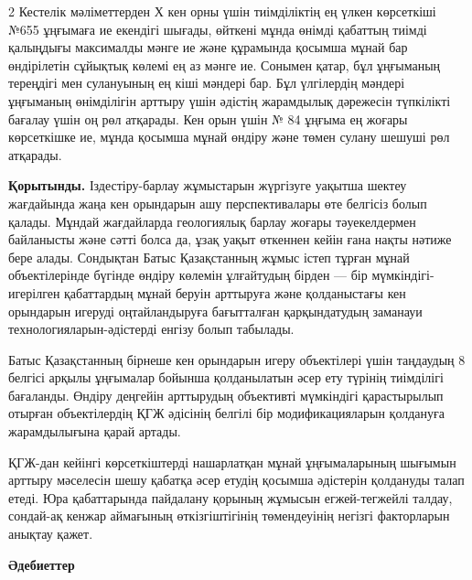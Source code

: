 \begin{multicols}{2}
Кестелік мәліметтерден Х кен орны үшін тиімділіктің ең үлкен көрсеткіші
№655 ұңғымаға ие екендігі шығады, өйткені мұнда өнімді қабаттың тиімді
қалыңдығы максималды мәнге ие және құрамында қосымша мұнай бар
өндірілетін сұйықтық көлемі ең аз мәнге ие. Сонымен қатар, бұл ұңғыманың
тереңдігі мен сулануының ең кіші мәндері бар. Бұл үлгілердің мәндері
ұңғыманың өнімділігін арттыру үшін әдістің жарамдылық дәрежесін
түпкілікті бағалау үшін оң рөл атқарады. Кен орын үшін № 84 ұңғыма ең
жоғары көрсеткішке ие, мұнда қосымша мұнай өндіру және төмен сулану
шешуші рөл атқарады.

{\bfseries Қорытынды.} Іздестіру-барлау жұмыстарын жүргізуге уақытша шектеу
жағдайында жаңа кен орындарын ашу перспективалары өте белгісіз болып
қалады. Мұндай жағдайларда геологиялық барлау жоғары тәуекелдермен
байланысты және сәтті болса да, ұзақ уақыт өткеннен кейін ғана нақты
нәтиже бере алады. Сондықтан Батыс Қазақстанның жұмыс істеп тұрған мұнай
объектілерінде бүгінде өндіру көлемін ұлғайтудың бірден --- бір
мүмкіндігі-игерілген қабаттардың мұнай беруін арттыруға және
қолданыстағы кен орындарын игеруді оңтайландыруға бағытталған
қарқындатудың заманауи технологияларын-әдістерді енгізу болып табылады.

Батыс Қазақстанның бірнеше кен орындарын игеру объектілері үшін
таңдаудың 8 белгісі арқылы ұңғымалар бойынша қолданылатын әсер ету
түрінің тиімділігі бағаланды. Өндіру деңгейін арттырудың объективті
мүмкіндігі қарастырылып отырған объектілердің ҚГЖ әдісінің белгілі бір
модификацияларын қолдануға жарамдылығына қарай артады.

ҚГЖ-дан кейінгі көрсеткіштерді нашарлатқан мұнай ұңғымаларының шығымын
арттыру мәселесін шешу қабатқа әсер етудің қосымша әдістерін қолдануды
талап етеді. Юра қабаттарында пайдалану қорының жұмысын егжей-тегжейлі
талдау, сондай-ақ кенжар аймағының өткізгіштігінің төмендеуінің негізгі
факторларын анықтау қажет.
\end{multicols}

\begin{center}
{\bfseries Әдебиеттер}
\end{center}

